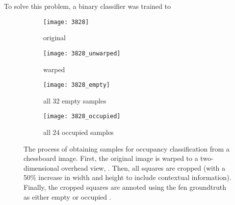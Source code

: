 \documentclass[../main.tex]{subfiles}
\begin{document}
To solve this problem, a binary classifier was trained to 
\begin{figure}
    \centering
    \begin{subfigure}[b]{0.47\textwidth}
        \centering
        \texttt{[image: 3828]}
        \caption{original}
        \label{fig:occupancy_classification_samples_original}
    \end{subfigure}
    \hfill
    \begin{subfigure}[b]{0.47\textwidth}
        \centering
        \texttt{[image: 3828\_unwarped]}
        \caption{warped}
        \label{fig:occupancy_classification_samples_warped}
    \end{subfigure}
    \hfill
    \begin{subfigure}[b]{0.47\textwidth}
        \centering
        \texttt{[image: 3828\_empty]}
        \caption{all 32 empty samples}
        \label{fig:occupancy_classification_samples_empty}
    \end{subfigure}
    \hfill
    \begin{subfigure}[b]{0.47\textwidth}
        \centering
        \texttt{[image: 3828\_occupied]}
        \caption{all 24 occupied samples}
        \label{fig:occupancy_classification_samples_occupied}
    \end{subfigure}
    \caption[The process of obtaining samples for occupancy classification from a chessboard image.]{The process of obtaining samples for occupancy classification from a chessboard image. First, the original image  is warped to a two-dimensional overhead view, . Then, all squares are cropped (with a 50\% increase in width and height to include contextual information). Finally, the cropped squares are annoted using the \gls{fen} groundtruth as either empty  or occupied .}
    \label{fig:occupancy_classification_samples}
\end{figure}
\end{document}

